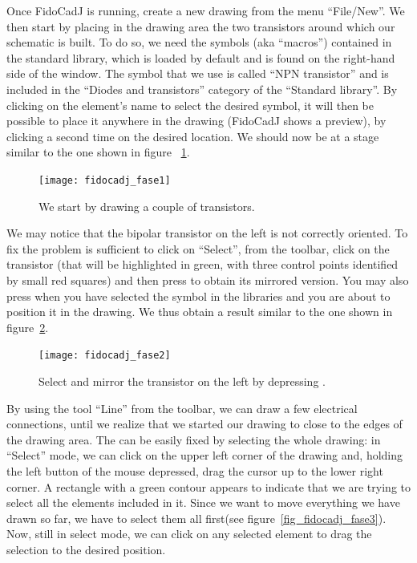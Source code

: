\documentclass[10pt,a4paper,twoside]{scrreprt}
\newcommand{\keyevidence}[1]{\fbox{#1}}
\begin{document}
Once FidoCadJ is running, create a new drawing from the menu
``File/New''. We then start by placing in the drawing area the two transistors around which our schematic
is built. To do so, we need the symbols (aka ``macros'') contained in the standard library, which is loaded by default and is
found on the right-hand side of the window. The symbol that we
use is called ``NPN transistor'' and is included in the ``Diodes
and transistors'' category of the ``Standard library''. By clicking
on the element's name to select the desired symbol, it
will then be possible to place it anywhere in the drawing (FidoCadJ shows a preview), by clicking a second time on the desired location. We should now be at a stage similar to the one shown in figure ~\ref{fig_fidocadj_fase1}.

%
\begin{figure}
\texttt{[image: fidocadj\_fase1]}

\caption{We start by drawing a couple of transistors.}

\label{fig_fidocadj_fase1}
\end{figure}

We may notice that the bipolar transistor on the left is not correctly
oriented. To fix the problem is sufficient to click on ``Select'',
from the toolbar, click on the transistor (that will be highlighted
in green, with three control points identified
by small red squares) and then press \keyevidence{S} to obtain
its mirrored version. You may also press \keyevidence{S} when you have selected the symbol in the libraries and you are about to position it in the drawing. We thus obtain a result similar to the
one shown in figure~\ref{fig_fidocadj_fase2}.

\begin{figure}
\texttt{[image: fidocadj\_fase2]}
\caption{Select and mirror the transistor on the left by depressing \keyevidence{S}.}
\label{fig_fidocadj_fase2}
\end{figure}

By using the tool ``Line'' from the toolbar, we
can draw a few electrical connections, until we realize
that we started our drawing to close to the edges of the drawing area.
The can be easily fixed by selecting the whole drawing: in ``Select''
mode, we can click on the upper left corner of the drawing and, holding
the left button of the mouse depressed, drag the cursor up to the lower
right corner. A rectangle with a green contour appears to indicate
that we are trying to select all the elements included in it. Since
we want to move everything we have drawn so far, we have to select
them all first(see figure~\ref{fig_fidocadj_fase3}). Now, still
in select mode, we can click on any selected element to drag the selection
to the desired position.
\end{document}
